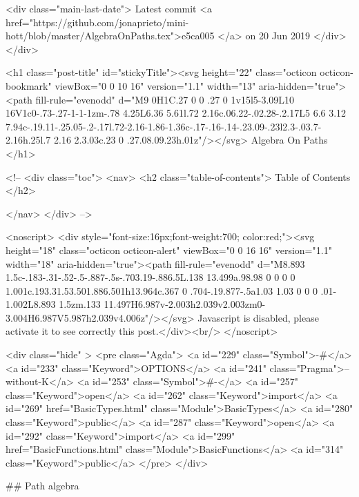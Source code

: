     <div class="main-last-date">
      Latest commit <a href="https://github.com/jonaprieto/mini-hott/blob/master/AlgebraOnPaths.tex">e5ca005 </a> on  20 Jun 2019
    </div>
  </div>
  
  <h1 class="post-title" id="stickyTitle"><svg height="22" class="octicon octicon-bookmark" viewBox="0 0 10 16" version="1.1" width="13" aria-hidden="true"><path fill-rule="evenodd" d="M9 0H1C.27 0 0 .27 0 1v15l5-3.09L10 16V1c0-.73-.27-1-1-1zm-.78 4.25L6.36 5.61l.72 2.16c.06.22-.02.28-.2.17L5 6.6 3.12 7.94c-.19.11-.25.05-.2-.17l.72-2.16-1.86-1.36c-.17-.16-.14-.23.09-.23l2.3-.03.7-2.16h.25l.7 2.16 2.3.03c.23 0 .27.08.09.23h.01z"/></svg> Algebra On Paths
  </h1>

  <!-- 
  <div class="toc">
    <nav>
    <h2 class="table-of-contents"> Table of Contents </h2>
      

    </nav>
  </div>
   -->

  <noscript>
  <div style="font-size:16px;font-weight:700; color:red;"><svg height="18" class="octicon octicon-alert" viewBox="0 0 16 16" version="1.1" width="18" aria-hidden="true"><path fill-rule="evenodd" d="M8.893 1.5c-.183-.31-.52-.5-.887-.5s-.703.19-.886.5L.138 13.499a.98.98 0 0 0 0 1.001c.193.31.53.501.886.501h13.964c.367 0 .704-.19.877-.5a1.03 1.03 0 0 0 .01-1.002L8.893 1.5zm.133 11.497H6.987v-2.003h2.039v2.003zm0-3.004H6.987V5.987h2.039v4.006z"/></svg> Javascript is disabled, please activate it to see correctly this post.</div><br/>
  </noscript>

  <div class="hide" >
<pre class="Agda">
<a id="229" class="Symbol">{-#</a> <a id="233" class="Keyword">OPTIONS</a> <a id="241" class="Pragma">--without-K</a> <a id="253" class="Symbol">#-}</a>
<a id="257" class="Keyword">open</a> <a id="262" class="Keyword">import</a> <a id="269" href="BasicTypes.html" class="Module">BasicTypes</a> <a id="280" class="Keyword">public</a>
<a id="287" class="Keyword">open</a> <a id="292" class="Keyword">import</a> <a id="299" href="BasicFunctions.html" class="Module">BasicFunctions</a> <a id="314" class="Keyword">public</a>
</pre>
</div>

## Path algebra

